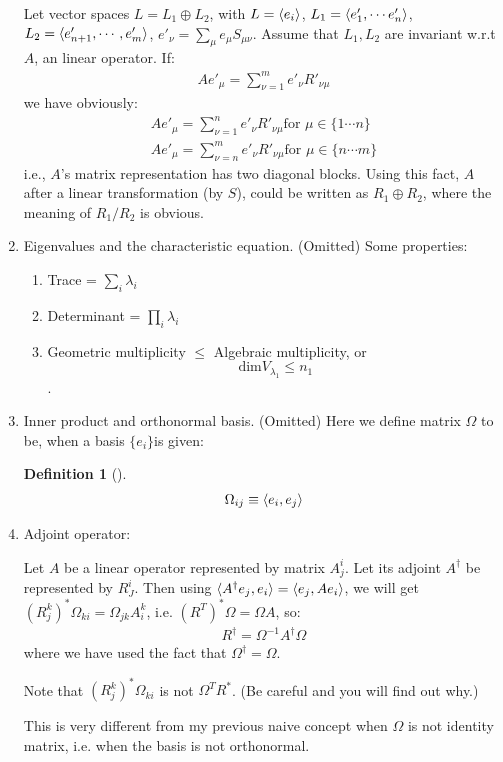\documentclass{article}
\numberwithin{equation}{subsection} %
\newtheorem{defi}{Definition}[section]
\theoremstyle{definition}
\begin{document}
\begin{enumerate}
        Let vector spaces $L=L_1\oplus L_2$, with $L=\braket{e_i}$,
        $L_1=\braket{e'_1,\cdots e'_n}$,$L_2=\braket{e'_{n+1},\cdots,e'_m}$,
        $e'_\nu=\sum_\mu e_\mu  S_{\mu\nu}$. 
        Assume that $L_1,L_2$ are invariant w.r.t $A$, an linear operator. If:
        \begin{align}
            A e'_\mu = \sum_{\nu=1}^{m} e'_\nu R'_{\nu\mu}
        \end{align}
        we have obviously:
        \begin{align}
            A e'_\mu = \sum_{\nu=1}^{n} e'_\nu R'_{\nu\mu} \text{for }
                \mu\in \{1\cdots n\}
                \\
            A e'_\mu = \sum_{\nu=n}^{m} e'_\nu R'_{\nu\mu} \text{for }
                \mu\in \{n\cdots m\}
        \end{align}
        i.e., $A$'s matrix representation has two diagonal blocks.
        Using this fact, $A$ after a linear transformation (by $S$),
        could be written as $R_1\oplus R_2$, where the meaning of $R_1/R_2$
        is obvious.
    \item Eigenvalues and the characteristic equation. (Omitted)
        Some properties:
        \begin{enumerate}
            \item Trace = $\sum_i \lambda_i$
            \item Determinant = $\prod_i \lambda_i$
            \item Geometric multiplicity $\leq$ Algebraic multiplicity, or
                $$\mathrm{dim}V_{\lambda_1} \leq n_1$$.
        \end{enumerate}
    \item Inner product and orthonormal basis. (Omitted) Here we define
        matrix $\Omega$ to be, when a basis $\{e_i\}$is given:
        \begin{defi}[]
            \begin{align}
                \Omega_{ij} \equiv \braket{e_i,e_j}
            \end{align}
        \end{defi}
    \item Adjoint operator:

        Let $A$ be a linear operator represented by matrix $A^i_j$. Let
        its adjoint $A^\dagger$ be represented by $R^i_J$. Then using
        $\braket{A^\dagger e_j, e_i} = \braket{e_j,A e_i}$, we will
        get $(R^{k}_j)^* \Omega_{ki}= \Omega_{jk}A^k_i$, i.e.
        $(R^T)^* \Omega = \Omega A$, so:
        \begin{align}
            R^\dagger = \Omega^{-1} A^\dagger \Omega
        \end{align}
        where we have used the fact that $\Omega^\dagger=\Omega$.

        Note that $(R^{k}_j)^* \Omega_{ki}$ is not $\Omega^T R^*$.
        (Be careful and you will find out why.)

        This is very different from my previous naive concept
        when $\Omega$ is not identity matrix, i.e. when the basis
        is not orthonormal.
\end{enumerate}
\end{document}
